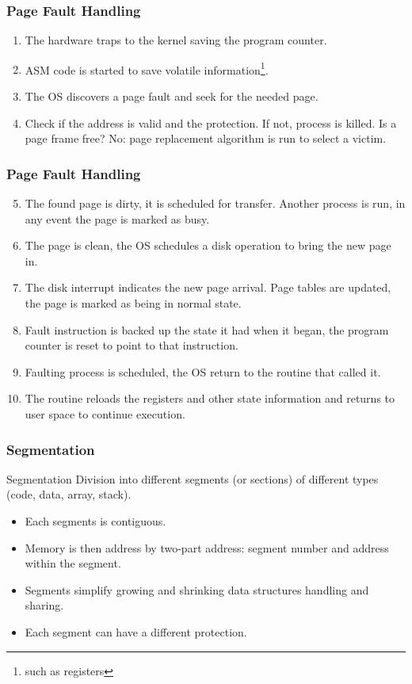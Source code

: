   \begin{frame}
    \frametitle{Page Fault Handling}
    \begin{enumerate}
      \item The hardware traps to the kernel saving the program counter.
      \item ASM code is started to save volatile information\footnote{such as registers}.
      \item The OS discovers a page fault and seek for the needed page.
      \item Check if the address is valid and the protection. If not, process is killed. Is a page frame free? No: page replacement algorithm is run to select a victim.
    \end{enumerate}
  \end{frame}

  \begin{frame}
    \frametitle{Page Fault Handling}
    \begin{enumerate}\setcounter{enumi}{4}
      \item The found page is dirty, it is scheduled for transfer. Another process is run, in any event the page is marked as busy.
      \item The page is clean, the OS schedules a disk operation to bring the new page in.
      \item The disk interrupt indicates the new page arrival. Page tables are updated, the page is marked as being in normal state.
      \item Fault instruction is backed up the state it had when it began, the program counter is reset to point to that instruction.
      \item Faulting process is scheduled, the OS return to the routine that called it.
      \item The routine reloads the registers and other state information and returns to user space to continue execution.
    \end{enumerate}
  \end{frame}

  \begin{frame}
    \frametitle{Segmentation}
    \begin{block}{Segmentation}
      Division into different segments (or sections) of different types (code, data, array, stack).
      \begin{itemize}
        \item Each segments is contiguous.
        \item Memory is then address by two-part address: segment number and address within the segment.
        \item Segments simplify growing and shrinking data structures handling and sharing.
        \item Each segment can have a different protection.
      \end{itemize}

    \end{block}
  \end{frame}

